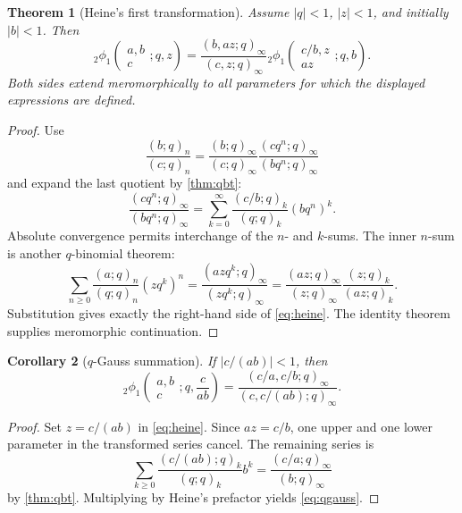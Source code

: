 \documentclass[11pt]{article}
\numberwithin{equation}{section}
\newtheorem{theorem}{Theorem}[section]
\newtheorem{corollary}[theorem]{Corollary}
\theoremstyle{definition}
\theoremstyle{remark}
\begin{document}
\begin{theorem}[Heine's first transformation]\label{thm:heine}
Assume $|q|<1$, $|z|<1$, and initially $|b|<1$.  Then
\begin{equation}\label{eq:heine}
{}_2\phi_1\!\left(\begin{matrix}a,b\\c\end{matrix};q,z\right)
=\frac{(b,az;q)_\infty}{(c,z;q)_\infty}
{}_2\phi_1\!\left(\begin{matrix}c/b,z\\az\end{matrix};q,b\right).
\end{equation}
Both sides extend meromorphically to all parameters for which the displayed
expressions are defined.
\end{theorem}
\begin{proof}
Use
\[
\frac{(b;q)_n}{(c;q)_n}
=\frac{(b;q)_\infty}{(c;q)_\infty}
 \frac{(cq^n;q)_\infty}{(bq^n;q)_\infty}
\]
and expand the last quotient by \cref{thm:qbt}:
\[
\frac{(cq^n;q)_\infty}{(bq^n;q)_\infty}
=\sum_{k=0}^{\infty}\frac{(c/b;q)_k}{(q;q)_k}(bq^n)^k.
\]
Absolute convergence permits interchange of the $n$- and $k$-sums.  The
inner $n$-sum is another $q$-binomial theorem:
\[
\sum_{n\ge0}\frac{(a;q)_n}{(q;q)_n}(zq^k)^n
=\frac{(azq^k;q)_\infty}{(zq^k;q)_\infty}
=\frac{(az;q)_\infty}{(z;q)_\infty}
  \frac{(z;q)_k}{(az;q)_k}.
\]
Substitution gives exactly the right-hand side of \eqref{eq:heine}.  The
identity theorem supplies meromorphic continuation.
\end{proof}

\begin{corollary}[$q$-Gauss summation]\label{cor:qgauss}
If $|c/(ab)|<1$, then
\begin{equation}\label{eq:qgauss}
{}_2\phi_1\!\left(\begin{matrix}a,b\\c\end{matrix};q,\frac{c}{ab}\right)
=\frac{(c/a,c/b;q)_\infty}{(c,c/(ab);q)_\infty}.
\end{equation}
\end{corollary}
\begin{proof}
Set $z=c/(ab)$ in \eqref{eq:heine}.  Since $az=c/b$, one upper and one lower
parameter in the transformed series cancel.  The remaining series is
\[
\sum_{k\ge0}\frac{(c/(ab);q)_k}{(q;q)_k}b^k
=\frac{(c/a;q)_\infty}{(b;q)_\infty}
\]
by \cref{thm:qbt}.  Multiplying by Heine's prefactor yields
\eqref{eq:qgauss}.
\end{proof}
\end{document}
